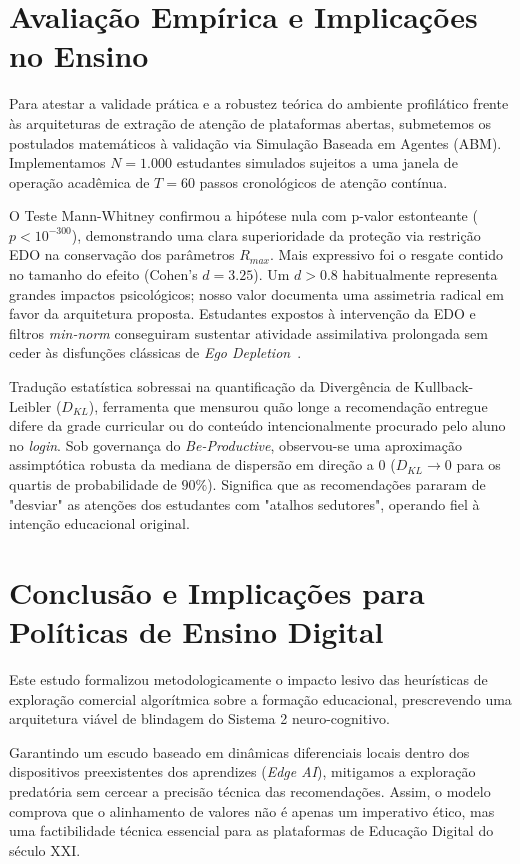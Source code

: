 \documentclass[english, spanish, brazilian]{RBIEarticle}
\begin{document}
\section{Avaliação Empírica e Implicações no Ensino} \label{sec:evaluation}

Para atestar a validade prática e a robustez teórica do ambiente profilático frente às arquiteturas de extração de atenção de plataformas abertas, submetemos os postulados matemáticos à validação via Simulação Baseada em Agentes (ABM). Implementamos $N=1.000$ estudantes simulados sujeitos a uma janela de operação acadêmica de $T=60$ passos cronológicos de atenção contínua. 

O Teste Mann-Whitney confirmou a hipótese nula com p-valor estonteante ($p < 10^{-300}$), demonstrando uma clara superioridade da proteção via restrição EDO na conservação dos parâmetros $R_{max}$. Mais expressivo foi o resgate contido no tamanho do efeito (Cohen's $d = 3.25$). Um $d > 0.8$ habitualmente representa grandes impactos psicológicos; nosso valor documenta uma assimetria radical em favor da arquitetura proposta. Estudantes expostos à intervenção da EDO e filtros \textit{min-norm} conseguiram sustentar atividade assimilativa prolongada sem ceder às disfunções clássicas de \textit{Ego Depletion}~\citep{kahneman2011}.

Tradução estatística sobressai na quantificação da Divergência de Kullback-Leibler ($D_{KL}$), ferramenta que mensurou quão longe a recomendação entregue difere da grade curricular ou do conteúdo intencionalmente procurado pelo aluno no \textit{login}. Sob governança do \textit{Be-Productive}, observou-se uma aproximação assimptótica robusta da mediana de dispersão em direção a $0$ ($D_{KL} \to 0$ para os quartis de probabilidade de $90\%$). Significa que as recomendações pararam de "desviar" as atenções dos estudantes com "atalhos sedutores", operando fiel à intenção educacional original.

\section{Conclusão e Implicações para Políticas de Ensino Digital} \label{sec:conclusion}

Este estudo formalizou metodologicamente o impacto lesivo das heurísticas de exploração comercial algorítmica sobre a formação educacional, prescrevendo uma arquitetura viável de blindagem do Sistema 2 neuro-cognitivo. 

Garantindo um escudo baseado em dinâmicas diferenciais locais dentro dos dispositivos preexistentes dos aprendizes (\textit{Edge AI}), mitigamos a exploração predatória sem cercear a precisão técnica das recomendações. Assim, o modelo comprova que o alinhamento de valores não é apenas um imperativo ético, mas uma factibilidade técnica essencial para as plataformas de Educação Digital do século XXI.

\printbibliography
\end{document}
